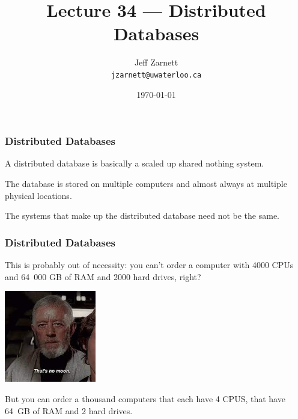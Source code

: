 

\title{Lecture  34 --- Distributed Databases}

\author{Jeff Zarnett \\ \small \texttt{jzarnett@uwaterloo.ca}}
\date{\today}




\begin{frame}
  \titlepage

 \end{frame}



\begin{frame}
\frametitle{Distributed Databases}

A distributed database is basically a scaled up shared nothing system. 

The database is stored on multiple computers and almost always at multiple physical locations.

 The systems that make up the distributed database need not be the same. 
 
  \end{frame}



\begin{frame}
\frametitle{Distributed Databases}

This is probably out of necessity: you can't order a computer with 4000 CPUs and 64~000 GB of RAM and 2000 hard drives, right? 

\begin{center}
	\includegraphics[width=0.3\textwidth]{images/nomoon.jpg}
\end{center}
 
But you can order a thousand computers that each have 4 CPUS, that have 64~GB of RAM and 2 hard drives.

\end{frame}



